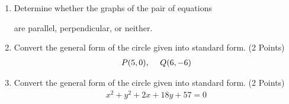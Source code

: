 \documentclass[11pt]{article}
\begin{document}
\begin{enumerate}
\begin{enumerate}
    \item Determine whether the graphs of the pair of equations 
    
    are parallel, perpendicular, or neither. 

\newpage

\item 
Convert the general form of the circle given into standard form. 
(2 Points)
\begin{align*}
    P(5, 0)
    \text{,}
    \hspace{0.5cm}
    Q(6, -6)
\end{align*}

\vspace{3in}

\item 
Convert the general form of the circle given into standard form. 
(2 Points)
\begin{align*}
    x^2 + y^2 + 2x + 18y + 57 = 0
\end{align*}

    
\end{enumerate}




\end{enumerate}
\end{document}
